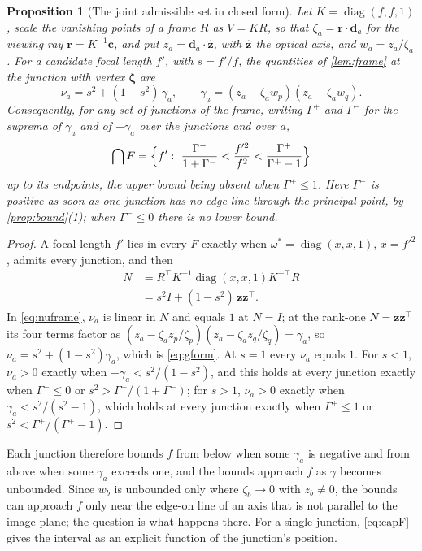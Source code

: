 \documentclass[pdflatex,sn-mathphys-num,iicol]{sn-jnl}
\newcommand{\vd}{\mathbf{d}}
\newcommand{\vr}{\mathbf{r}}
\newcommand{\vc}{\mathbf{c}}
\theoremstyle{thmstyleone}
\newtheorem{proposition}[theorem]{Proposition}
\theoremstyle{thmstylethree}
\theoremstyle{thmstyletwo}
\begin{document}
\begin{proposition}[The joint admissible set in closed form]\label{prop:gform}
Let $K=\operatorname{diag}(f,f,1)$, scale the vanishing points of a frame $R$ as $V=KR$, so that $\zeta_a=\vr\cdot\vd_a$ for the viewing ray $\vr=K^{-1}\vc$, and put $z_a=\vd_a\cdot\hat{\mathbf z}$, with $\hat{\mathbf z}$ the optical axis, and $w_a=z_a/\zeta_a$. For a candidate focal length $f'$, with $s=f'/f$, the quantities of \cref{lem:frame} at the junction with vertex $\boldsymbol\zeta$ are
\begin{equation}
\nu_a=s^2+(1-s^2)\,\gamma_a,\qquad \gamma_a=(z_a-\zeta_aw_p)(z_a-\zeta_aw_q).
\label{eq:gform}
\end{equation}
Consequently, for any set of junctions of the frame, writing $\Gamma^{+}$ and $\Gamma^{-}$ for the suprema of $\gamma_a$ and of $-\gamma_a$ over the junctions and over $a$,
\begin{equation}
\bigcap F=\Bigl\{f':\ \frac{\Gamma^{-}}{1+\Gamma^{-}}<\frac{f'^2}{f^2}<\frac{\Gamma^{+}}{\Gamma^{+}-1}\Bigr\}
\label{eq:capF}
\end{equation}
up to its endpoints, the upper bound being absent when $\Gamma^{+}\le1$. Here $\Gamma^{-}$ is positive as soon as one junction has no edge line through the principal point, by \cref{prop:bound}(1); when $\Gamma^{-}\le0$ there is no lower bound.
\end{proposition}
\begin{proof}
A focal length $f'$ lies in every $F$ exactly when $\omega^{*}=\operatorname{diag}(x,x,1)$, $x=f'^2$, admits every junction, and then
\[
\begin{aligned}
N&=R^{\top}K^{-1}\operatorname{diag}(x,x,1)K^{-\top}R\\
&=s^2I+(1-s^2)\,\mathbf z\mathbf z^{\top}.
\end{aligned}
\]
In \eqref{eq:nuframe}, $\nu_a$ is linear in $N$ and equals $1$ at $N=I$; at the rank-one $N=\mathbf z\mathbf z^{\top}$ its four terms factor as $(z_a-\zeta_az_p/\zeta_p)(z_a-\zeta_az_q/\zeta_q)=\gamma_a$, so $\nu_a=s^2+(1-s^2)\gamma_a$, which is \eqref{eq:gform}. At $s=1$ every $\nu_a$ equals $1$. For $s<1$, $\nu_a>0$ exactly when $-\gamma_a<s^2/(1-s^2)$, and this holds at every junction exactly when $\Gamma^{-}\le0$ or $s^2>\Gamma^{-}/(1+\Gamma^{-})$; for $s>1$, $\nu_a>0$ exactly when $\gamma_a<s^2/(s^2-1)$, which holds at every junction exactly when $\Gamma^{+}\le1$ or $s^2<\Gamma^{+}/(\Gamma^{+}-1)$.
\end{proof}

Each junction therefore bounds $f$ from below when some $\gamma_a$ is negative and from above when some $\gamma_a$ exceeds one, and the bounds approach $f$ as $\gamma$ becomes unbounded. Since $w_b$ is unbounded only where $\zeta_b\to0$ with $z_b\neq0$, the bounds can approach $f$ only near the edge-on line of an axis that is not parallel to the image plane; the question is what happens there. For a single junction, \eqref{eq:capF} gives the interval as an explicit function of the junction's position.
\end{document}
